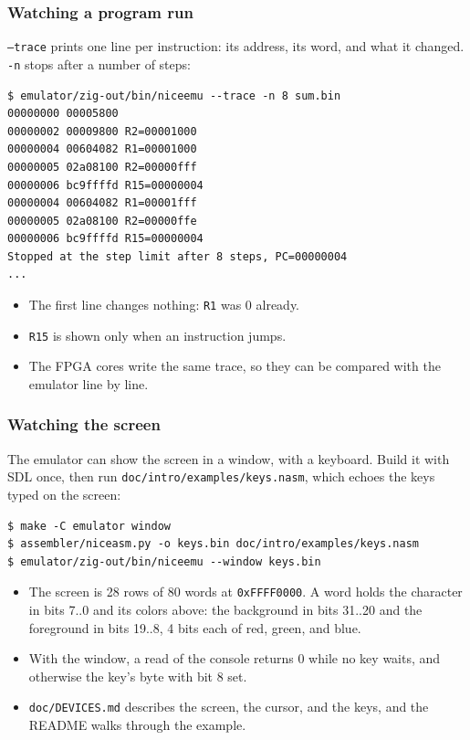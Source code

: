 \documentclass{beamer}
\newcommand{\code}[1]{\texttt{#1}}
\begin{document}
  \begin{frame}[fragile]
   \frametitle{Watching a program run}
   \code{--trace} prints one line per instruction: its address, its word,
   and what it changed. \code{-n} stops after a number of steps:
   {\footnotesize
   \begin{verbatim}
$ emulator/zig-out/bin/niceemu --trace -n 8 sum.bin
00000000 00005800
00000002 00009800 R2=00001000
00000004 00604082 R1=00001000
00000005 02a08100 R2=00000fff
00000006 bc9ffffd R15=00000004
00000004 00604082 R1=00001fff
00000005 02a08100 R2=00000ffe
00000006 bc9ffffd R15=00000004
Stopped at the step limit after 8 steps, PC=00000004
...
   \end{verbatim}
   }
   \begin{itemize}
    \item The first line changes nothing: \code{R1} was 0 already.
    \item \code{R15} is shown only when an instruction jumps.
    \item The FPGA cores write the same trace, so they can be
     compared with the emulator line by line.
   \end{itemize}
  \end{frame}
%
  \begin{frame}[fragile]
   \frametitle{Watching the screen}
   The emulator can show the screen in a window, with a keyboard. Build it
   with SDL once, then run \code{doc/intro/examples/keys.nasm}, which
   echoes the keys typed on the screen:
   {\footnotesize
   \begin{verbatim}
$ make -C emulator window
$ assembler/niceasm.py -o keys.bin doc/intro/examples/keys.nasm
$ emulator/zig-out/bin/niceemu --window keys.bin
   \end{verbatim}
   }
   \begin{itemize}
    \item The screen is 28 rows of 80 words at \code{0xFFFF0000}. A word
     holds the character in bits 7..0 and its colors above: the background
     in bits 31..20 and the foreground in bits 19..8, 4 bits each of red,
     green, and blue.
    \item With the window, a read of the console returns 0 while no key
     waits, and otherwise the key's byte with bit 8 set.
    \item \code{doc/DEVICES.md} describes the screen, the cursor, and the
     keys, and the README walks through the example.
   \end{itemize}
  \end{frame}
\end{document}
